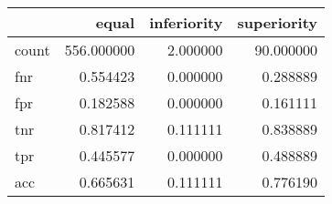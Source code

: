 \begin{tabular}{lrrr}
\toprule
{} &       equal &  inferiority &  superiority \\
\midrule
count &  556.000000 &     2.000000 &    90.000000 \\
fnr   &    0.554423 &     0.000000 &     0.288889 \\
fpr   &    0.182588 &     0.000000 &     0.161111 \\
tnr   &    0.817412 &     0.111111 &     0.838889 \\
tpr   &    0.445577 &     0.000000 &     0.488889 \\
acc   &    0.665631 &     0.111111 &     0.776190 \\
\bottomrule
\end{tabular}
